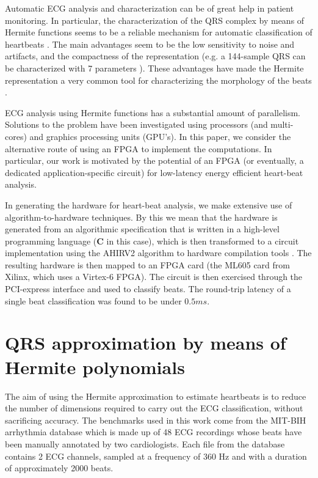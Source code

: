 \documentclass[conference]{IEEEtran}
\begin{document}
Automatic ECG analysis and characterization can be of great help
in patient monitoring.
In particular, the characterization of the QRS complex by means of Hermite functions 
seems to be a reliable mechanism  for automatic classification of heartbeats \cite{j:lagerholm00}. 
The main advantages seem to be the low sensitivity to noise and artifacts, and the
compactness of the representation (e.g. a 144-sample QRS can be characterized with 7 parameters \cite{c:marquez13}). 
These advantages have made the Hermite representation a very common tool for characterizing the 
morphology of the beats \cite{j:lagerholm00,c:marquez13,c:braccini97,j:linh03a,j:linh03b}. 

ECG analysis using Hermite functions has a
substantial amount of parallelism.  Solutions to the problem have been investigated
using processors (and multi-cores) and graphics processing units (GPU's). 
In this paper, we consider the alternative route of using an FPGA to implement
the computations.  In particular, our work is motivated by the potential
of an FPGA (or eventually, a dedicated application-specific circuit) for low-latency
energy efficient heart-beat analysis.  

In generating the hardware for heart-beat analysis, we make extensive use of
algorithm-to-hardware techniques.  By this we mean that the hardware is
generated from an algorithmic specification that is written in a
high-level programming language ({\bf C} in this case), which is then
transformed to a circuit implementation using the AHIRV2 algorithm to hardware 
compilation tools \cite{c:ahir_thesis2009,c:ahir_dsd2010,c:ahir_usenix2012}.
The resulting hardware is then mapped to an FPGA card (the ML605 card from Xilinx,
which uses a Virtex-6 FPGA).  The circuit is then exercised through the PCI-express 
interface and used to classify beats.  The round-trip latency of a single
beat classification was found to be under $0.5ms$.


\section{QRS approximation by means of Hermite polynomials}\label{s:arr}

The aim of using the Hermite approximation to estimate heartbeats is to 
reduce the number of dimensions required to carry out the ECG classification, 
without sacrificing accuracy. 
The benchmarks used in this work come from the MIT-BIH arrhythmia database \cite{j:moody01} which is made up of 
48 ECG recordings whose beats  have been manually annotated by two cardiologists. 
Each file from the database 
contains 2 ECG channels, sampled at a frequency of 360 Hz and with a duration of approximately 2000 beats. 
\end{document}
